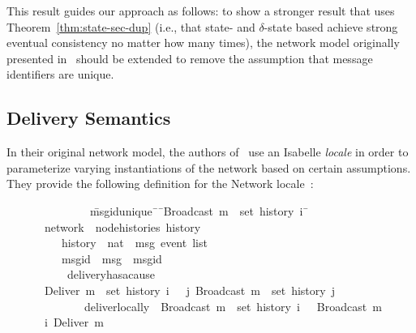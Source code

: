 This result guides our approach as follows: to show a stronger result that uses
Theorem~\ref{thm:state-sec-dup} (i.e., that state- and $\delta$-state based
\CRDTs achieve strong eventual consistency no matter how many times), the network
model originally presented in~\citep{gomes17} should be extended to remove the
assumption that message identifiers are unique.

\subsection{Delivery Semantics}
In their original network model, the authors of~\citep{gomes17} use an Isabelle
\textit{locale} in order to parameterize varying instantiations of the network
based on certain assumptions. They provide the following definition for the
Network locale~\citep{gomes17}:
\begin{figure}[H]
\begin{isabelle}
~~~~~~~~\ \=msg{\isacharunderscore}id{\isacharunderscore}unique{\isacharcolon}\ \={\isasymrbrakk}\ \={\isachardoublequoteopen}Broadcast\ m\ {\isasymin}\ set\ {\isacharparenleft}history\ i{\isacharparenright}\ \=\kill
{}\ network\ {\isacharequal}\ node{\isacharunderscore}histories\ history\\
~~~~\>history\ {\isacharcolon}{\isacharcolon}\ {\isachardoublequoteopen}nat\ {\isasymRightarrow}\ {\isacharprime}msg\ event\ list{\isachardoublequoteclose}\ {\isacharplus}\\
~~~~\>msg{\isacharunderscore}id\ {\isacharcolon}{\isacharcolon}\ {\isachardoublequoteopen}{\isacharprime}msg\ {\isasymRightarrow}\ {\isacharprime}msgid{\isachardoublequoteclose}\\
~~~~\ delivery{\isacharunderscore}has{\isacharunderscore}a{\isacharunderscore}cause{\isacharcolon}\\
\>\>{\isasymlbrakk}\ {\isachardoublequoteopen}Deliver\ m\ {\isasymin}\ set\ {\isacharparenleft}history\ i{\isacharparenright}\ \>\>{\isasymrbrakk}\ {\isasymLongrightarrow}\ {\isasymexists}j{\isachardot}\ Broadcast\ m\ {\isasymin}\ set\ {\isacharparenleft}history\ j{\isacharparenright}{\isachardoublequoteclose}\\
~~~~~~~~\>deliver{\isacharunderscore}locally{\isacharcolon}\ \>{\isasymlbrakk}\ \>{\isachardoublequoteopen}Broadcast\ m\ {\isasymin}\ set\ {\isacharparenleft}history\ i{\isacharparenright}\ \>{\isasymrbrakk}\ {\isasymLongrightarrow}\  Broadcast\ m\ {\isasymsqsubset}\isactrlsup i\ Deliver\ m{\isachardoublequoteclose}\\

\end{isabelle}
\end{figure}
